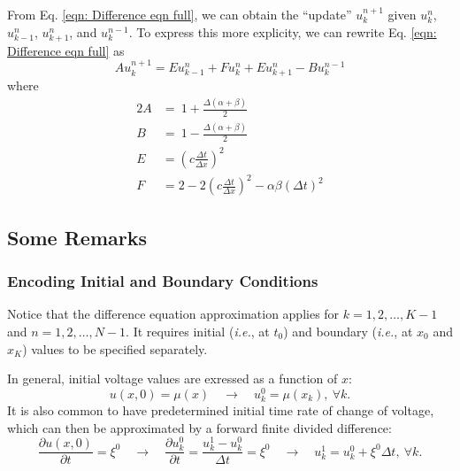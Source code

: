 \documentclass{article}
\begin{document}
From Eq. \ref{eqn: Difference eqn full}, we can obtain the ``update'' $u_{k}^{n+1}$
given $u_{k}^{n}$, $u_{k-1}^{n}$, $u_{k+1}^{n}$, and $u_{k}^{n-1}$.
To express this more explicity, we can rewrite Eq. \ref{eqn: Difference eqn full} as
\begin{equation}
   \label{eqn: Difference eqn short}
   A u_{k}^{n+1} = E u_{k-1}^{n} + F u_{k}^{n} + E u_{k+1}^{n} - B u_{k}^{n-1}
\end{equation}
where
\begin{alignat}{2}
   \label{eqn: A}
   A &=\ 1 + \frac{\Delta \left(\alpha + \beta\right)}{2} \\
   \label{eqn: B}
   B &=\ 1 - \frac{\Delta \left(\alpha + \beta\right)}{2} \\
   \label{eqn: E}
   E &= \left(c \frac{\Delta t}{\Delta x}\right)^{2} \\
   \label{eqn: F}
   F &= 2 - 2 \left(c \frac{\Delta t}{\Delta x}\right)^{2} - \alpha \beta \left(\Delta t\right)^{2}
\end{alignat}

\subsection{Some Remarks}
\label{subsec: Some Remarks}

\subsubsection{Encoding Initial and Boundary Conditions}
\label{subsubsec: Encoding Initial and Boundary Conditions}

Notice that the difference equation approximation applies for $k=1,2,\ldots,K-1$ and $n=1,2,\ldots,N-1$.
It requires initial (\textit{i.e.}, at $t_{0}$) and boundary (\textit{i.e.}, at $x_{0}$ and $x_{K}$) values to be specified separately.

In general, initial voltage values are exressed as a function of $x$:
\begin{equation*}
   u \left(x,0\right) = \mu \left(x\right)
   \quad\longrightarrow\quad
   u_{k}^{0} = \mu \left(x_{k}\right),\ \forall k.
\end{equation*}
It is also common to have predetermined initial time rate of change of voltage,
which can then be approximated by a forward finite divided difference:
\begin{equation*}
   \frac{\partial u \left(x,0\right)}{\partial t} = \xi^{0}
   \quad\longrightarrow\quad
   \frac{\partial u_{k}^{0}}{\partial t} =
   \frac{u_{k}^{1} - u_{k}^{0}}{\Delta t} = \xi^{0}
   \quad\longrightarrow\quad
   u_{k}^{1} = u_{k}^{0} + \xi^{0} \Delta t,\ \forall k.
\end{equation*}
\end{document}
